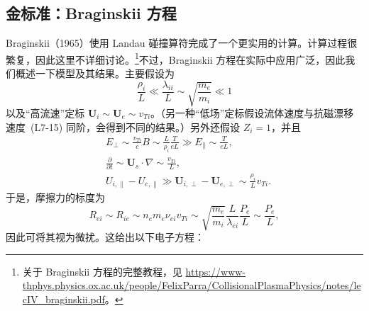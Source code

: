 \subsection{金标准：Braginskii 方程}
Braginskii（1965）使用 Landau 碰撞算符完成了一个更实用的计算。计算过程很繁复，因此这里不详细讨论。\footnote{\raggedright 关于 Braginskii 方程的完整教程，见 \url{https://www-thphys.physics.ox.ac.uk/people/FelixParra/CollisionalPlasmaPhysics/notes/lecIV_braginskii.pdf}。}不过，Braginskii 方程在实际中应用广泛，因此我们概述一下模型及其结果。主要假设为
\begin{equation}
\frac{\rho_i}{L}\ll\frac{\lambda_{ii}}L\sim\sqrt{\frac{m_e}{m_i}}\ll1
\tag{L7-46}\label{eq:L7:46}
\end{equation}
以及“高流速”定标 $\boldsymbol U_i\sim\boldsymbol U_e\sim v_{Ti}$。（另一种“低场”定标假设流体速度与抗磁漂移速度~(L7-15) 同阶，会得到不同的结果。）另外还假设 $Z_i=1$，并且
\begin{align}
&E_\perp\sim\frac{v_{Ti}}cB\sim\frac L{\rho_i}\frac T{eL}
 \gg E_\parallel\sim\frac T{eL},
 \tag{L7-47}\label{eq:L7:47}\\
&\frac\partial{\partial t}\sim\boldsymbol U_s\cdot\nabla\sim\frac{v_{Ti}}L,
 \tag{L7-48}\label{eq:L7:48}\\
&U_{i,\parallel}-U_{e,\parallel}
 \gg\boldsymbol U_{i,\perp}-\boldsymbol U_{e,\perp}
 \sim\frac{\rho_i}L v_{Ti}.
 \tag{L7-49}\label{eq:L7:49}
\end{align}
于是，摩擦力的标度为
\begin{equation}
R_{ei}\sim R_{ie}\sim n_em_e\nu_{ei}v_{Ti}
\sim\sqrt{\frac{m_e}{m_i}}\frac L{\lambda_{ei}}\frac{P_e}L
\sim\frac{P_e}L,
\tag{L7-50}\label{eq:L7:50}
\end{equation}
因此可将其视为微扰。这给出以下电子方程：
